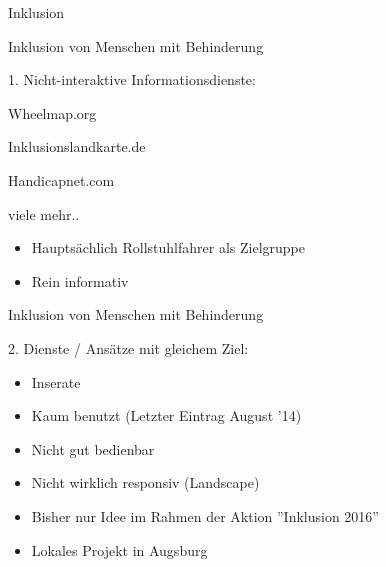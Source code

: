 

\begin{subsection}{Inklusion}
\begin{frame}{Inklusion von Menschen mit Behinderung}

\begin{titleditems}{1. Nicht-interaktive Informationsdienste:}
\pause
\item Wheelmap.org \cite{wheelmap}
\item Inklusionslandkarte.de \cite{Inklusionslandkarte}
\item Handicapnet.com \cite{handicapnet}
\item viele mehr..
\end{titleditems}

\begin{itemize}[<+->]
\pause
\item[\strong{$\rightarrow$}]Hauptsächlich Rollstuhlfahrer als Zielgruppe
\item[\strong{$\rightarrow$}]Rein informativ \pause {}
\end{itemize}

\end{frame}


\begin{frame}{Inklusion von Menschen mit Behinderung}


\begin{titleditems}{2. Dienste / Ansätze mit gleichem Ziel:}
\pause
\item {} \cite{ziemlichbestebegleiter}
	\pause
	\begin{itemize}[<+->]
	\item Inserate \pause {} \pause
	\item Kaum benutzt (Letzter Eintrag August '14)
	\item Nicht gut bedienbar
	\item Nicht wirklich responsiv (Landscape)
	\end{itemize}
	\pause
\item {} \cite{dieglocke}
	\pause
	\begin{itemize}
	\item Bisher nur Idee im Rahmen der Aktion ''Inklusion 2016''
	\item Lokales Projekt in Augsburg
	\end{itemize}

\end{titleditems}

\pause
{}


\end{frame}

\end{subsection} %


